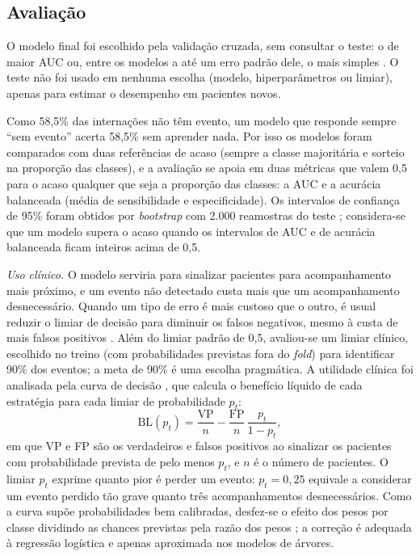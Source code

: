 \documentclass[conference]{IEEEtran}
\begin{document}
\subsection{Avaliação}

O modelo final foi escolhido pela validação cruzada, sem consultar o teste: o de maior AUC ou, entre os modelos a até um erro padrão dele, o mais simples \cite{b5}. O teste não foi usado em nenhuma escolha (modelo, hiperparâmetros ou limiar), apenas para estimar o desempenho em pacientes novos.

Como 58,5\% das internações não têm evento, um modelo que responde sempre ``sem evento'' acerta 58,5\% sem aprender nada. Por isso os modelos foram comparados com duas referências de acaso (sempre a classe majoritária e sorteio na proporção das classes), e a avaliação se apoia em duas métricas que valem 0,5 para o acaso qualquer que seja a proporção das classes: a AUC \cite{b16} e a acurácia balanceada (média de sensibilidade e especificidade). Os intervalos de confiança de 95\% foram obtidos por \textit{bootstrap} com 2.000 reamostras do teste \cite{b17}; considera-se que um modelo supera o acaso quando os intervalos de AUC e de acurácia balanceada ficam inteiros acima de 0,5.

\textit{Uso clínico.} O modelo serviria para sinalizar pacientes para acompanhamento mais próximo, e um evento não detectado custa mais que um acompanhamento desnecessário. Quando um tipo de erro é mais custoso que o outro, é usual reduzir o limiar de decisão para diminuir os falsos negativos, mesmo à custa de mais falsos positivos \cite{b5}. Além do limiar padrão de 0,5, avaliou-se um limiar clínico, escolhido no treino (com probabilidades previstas fora do \textit{fold}) para identificar 90\% dos eventos; a meta de 90\% é uma escolha pragmática. A utilidade clínica foi analisada pela curva de decisão \cite{b18}, que calcula o benefício líquido de cada estratégia para cada limiar de probabilidade $p_t$:
\begin{equation}
\text{BL}(p_t) = \frac{\text{VP}}{n} - \frac{\text{FP}}{n}\,\frac{p_t}{1 - p_t},
\end{equation}
em que VP e FP são os verdadeiros e falsos positivos ao sinalizar os pacientes com probabilidade prevista de pelo menos $p_t$, e $n$ é o número de pacientes. O limiar $p_t$ exprime quanto pior é perder um evento: $p_t = 0{,}25$ equivale a considerar um evento perdido tão grave quanto três acompanhamentos desnecessários. Como a curva supõe probabilidades bem calibradas, desfez-se o efeito dos pesos por classe dividindo as chances previstas pela razão dos pesos \cite{b19}; a correção é adequada à regressão logística e apenas aproximada nos modelos de árvores.
\end{document}
